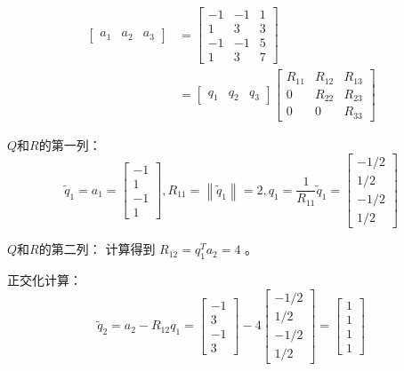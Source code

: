 \begin{example}
    $$
\begin{aligned}
\left[\begin{array}{lll}
a_{1} & a_{2} & a_{3}
\end{array}\right] &=\left[\begin{array}{rrr}
-1 & -1 & 1 \\
1 & 3 & 3 \\
-1 & -1 & 5 \\
1 & 3 & 7
\end{array}\right] \\
&=\left[\begin{array}{lll}
q_{1} & q_{2} & q_{3}
\end{array}\right]\left[\begin{array}{ccc}
R_{11} & R_{12} & R_{13} \\
0 & R_{22} & R_{23} \\
0 & 0 & R_{33}
\end{array}\right]
\end{aligned}
$$

$Q$和$R$的第一列：
$$
\tilde{q}_{1}=a_{1}=\left[\begin{array}{r}
-1 \\
1 \\
-1 \\
1
\end{array}\right],  R_{11}=\left\|\tilde{q}_{1}\right\|=2,  q_{1}=\frac{1}{R_{11}} \tilde{q}_{1}=\left[\begin{array}{r}
-1 / 2 \\
1 / 2 \\
-1 / 2 \\
1 / 2
\end{array}\right]
$$

$Q$和$R$的第二列：
计算得到 $R_{12}=q_{1}^{T} a_{2}=4$ 。

正交化计算：
$$
\tilde{q}_{2}=a_{2}-R_{12} q_{1}=\left[\begin{array}{r}
-1 \\
3 \\
-1 \\
3
\end{array}\right]-4\left[\begin{array}{c}
-1 / 2 \\
1 / 2 \\
-1 / 2 \\
1 / 2
\end{array}\right]=\left[\begin{array}{l}
1 \\
1 \\
1 \\
1
\end{array}\right]
$$


\end{example}
